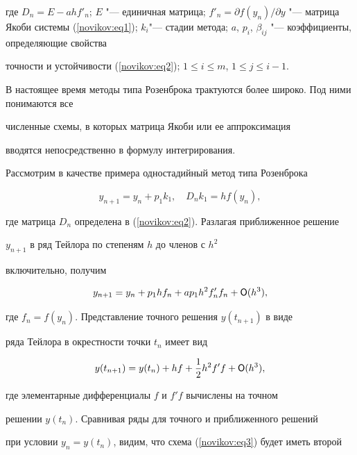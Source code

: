 где $D_n =E-ahf'_n$; $E$ "--- единичная матрица; $f'_n =\partial f(y_n) /\partial y$ "--- матрица Якоби системы (\ref{novikov:eq1}); $k_i$"--- стадии метода; $a$, $p_i$, $\beta_{ij}$ "--- коэффициенты, определяющие свойства

точности и устойчивости (\ref{novikov:eq2});  $1 \leq i \leq

m$, $1 \leq j \leq i-1$. 

В настоящее время методы типа Розенброка трактуются более широко. Под ними понимаются все

численные схемы, в которых матрица Якоби или ее аппроксимация

вводятся непосредственно в формулу интегрирования.



Рассмотрим в качестве примера одностадийный метод типа Розенброка

\begin{equation}

\label{novikov:eq3}

y_{n+1}=y_n+p_1k_1,\quad D_nk_1=hf(y_n),

\end{equation}

где матрица $D_n$ определена в (\ref{novikov:eq2}). Разлагая приближенное решение

$y_{n+1}$ в ряд Тейлора по степеням $h$ до членов с $h^2$

включительно, получим

\begin{equation*}

y_{n+1}=y_n+p_1hf_n+ap_1h^2f'_nf_n+{\sf O}(h^3),

\end{equation*}

где $f_n=f(y_n)$. Представление точного решения $y(t_{n+1})$ в виде

ряда Тейлора в окрестности точки $t_n$ имеет вид

\begin{equation*}

y(t_{n+1})=y(t_n)+hf+\frac{1}{2}h^2f'f+{\sf O}(h^3),

\end{equation*}

где элементарные дифференциалы $f$ и $f'f$ вычислены на точном

решении $y(t_n)$. Сравнивая ряды для точного и приближенного решений

при условии $y_n=y(t_n)$, видим, что схема (\ref{novikov:eq3}) будет иметь второй

